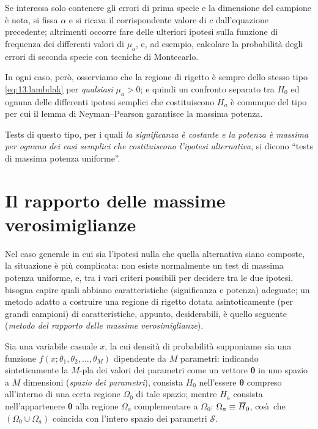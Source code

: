Se interessa solo contenere gli errori di prima specie e la
dimensione del campione \`e nota, si fissa $\alpha$ e si
ricava il corrispondente valore di $c$ dall'equazione
precedente; altrimenti occorre fare delle ulteriori ipotesi
sulla funzione di frequenza dei differenti valori di
$\mu_a$, e, ad esempio, calcolare la probabilit\`a degli
errori di seconda specie con tecniche di Montecarlo.

In ogni caso, per\`o, osserviamo che la regione di rigetto
\`e sempre dello stesso tipo \eqref{eq:13.lambdak} per
\emph{qualsiasi} $\mu_a > 0$; e quindi un confronto separato
tra $H_0$ ed ognuna delle differenti ipotesi semplici che
costituiscono $H_a$ \`e comunque del tipo per cui il lemma
di Neyman--Pearson garantisce la massima potenza.

Tests di questo tipo, per i quali \emph{la significanza \`e
  costante e la potenza \`e massima per ognuno dei casi
  semplici che costituiscono l'ipotesi alternativa}, si
dicono ``tests di massima potenza uniforme''.

\section{Il rapporto delle massime verosimiglianze}%
Nel caso generale in cui sia l'ipotesi nulla che quella
alternativa siano composte, la situazione \`e pi\`u
complicata: non esiste normalmente un test di massima
potenza uniforme, e, tra i vari criteri possibili per
decidere tra le due ipotesi, bisogna capire quali abbiano
caratteristiche (significanza e potenza) adeguate; un metodo
adatto a costruire una regione di rigetto dotata
asintoticamente (per grandi campioni) di caratteristiche,
appunto, desiderabili, \`e quello seguente (\emph{metodo del
  rapporto delle massime verosimiglianze}).

Sia una variabile casuale $x$, la cui densit\`a di
probabilit\`a supponiamo sia una funzione $f(x; \theta_1,
\theta_2,\ldots, \theta_M )$ dipendente da $M$ parametri:
indicando sinteticamente la $M$-pla dei valori dei parametri
come un vettore $\boldsymbol{\theta}$ in uno spazio a $M$
dimensioni (\emph{spazio dei parametri}), consista $H_0$
nell'essere $\boldsymbol{\theta}$ compreso all'interno di
una certa regione $\Omega_0$ di tale spazio; mentre $H_a$
consista nell'appartenere $\boldsymbol{\theta}$ alla
regione $\Omega_a$ complementare a $\Omega_0$: $\Omega_a
\equiv \ob{H}_0$, cos\`\i\ che $(\Omega_0 \cup
\Omega_a)$ coincida con l'intero spazio dei parametri
$\mathcal{S}$.

